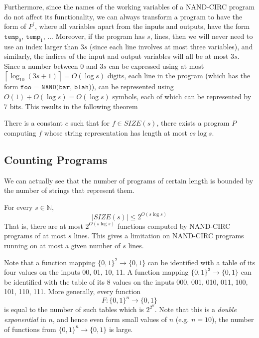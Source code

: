   Furthermore, since the names of the working variables of a NAND-CIRC program do not affect its functionality, we can always transform a program to have the form of $P^\prime$, where all variables apart from the inputs and outputs, have the form $\texttt{temp}_0$, $\texttt{temp}_1$, ... Moreover, if the program has $s$, lines, then we will never need to use an index larger than $3s$ (since each line involves at most three variables), and similarly, the indices of the input and output variables will all be at most $3s$. Since a number between $0$ and $3s$ can be expressed using at most $\left\lceil{\log_{10} (3s+1)} \right\rceil = O(\log s)$ digits, each line in the program (which has the form $\texttt{foo = NAND(bar, blah)}$), can be represented using $O(1) + O(\log s) = O(\log s)$ symbols, each of which can be represented by $7$ bits. This results in the following theorem 

  \begin{theorem}
  There is a constant $c$ such that for $f \in SIZE(s)$, there exists a program $P$ computing $f$ whose string representation has length at most $cs \log s$. 
  \end{theorem}

\subsection{Counting Programs}

  We can actually see that the number of programs of certain length is bounded by the number of strings that represent them. 

  \begin{theorem}
  For every $s \in \mathbb{N}$, 
  \[|SIZE(s)| \leq 2^{O(s \log s)}\]
  That is, there are at most $2^{O (s \log s)}$ functions computed by NAND-CIRC programs of at most $s$ lines. This gives a limitation on NAND-CIRC programs running on at most a given number of $s$ lines. 
  \end{theorem}

  Note that a function mapping $\{0,1\}^2 \longrightarrow \{0, 1\}$ can be identified with a table of its four values on the inputs 00, 01, 10, 11. A function mapping $\{0,1\}^3 \longrightarrow \{0,1\}$ can be identified with the table of its 8 values on the inputs 000, 001, 010, 011, 100, 101, 110, 111. More generally, every function 
  \[F: \{0,1\}^n \longrightarrow \{0,1\}\]
  is equal to the number of such tables which is $2^{2^n}$. Note that this is a \textit{double exponential} in $n$, and hence even form small values of $n$ (e.g. $n = 10$), the number of functions from $\{0,1\}^n \longrightarrow \{0,1\}$ is large. 

